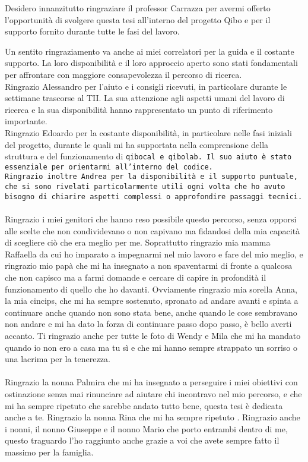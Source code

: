 Desidero innanzitutto ringraziare il professor Carrazza per avermi offerto l'opportunità di svolgere questa tesi all'interno del progetto Qibo e per il supporto fornito durante tutte le fasi del lavoro.

Un sentito ringraziamento va anche ai miei correlatori per la guida e il costante supporto. La loro disponibilità e il loro approccio aperto sono stati fondamentali per affrontare con maggiore consapevolezza il percorso di ricerca.\\
Ringrazio Alessandro per l'aiuto e i consigli ricevuti, in particolare durante le settimane trascorse al TII. La sua attenzione agli aspetti umani del lavoro di ricerca e la sua disponibilità hanno rappresentato un punto di riferimento importante.\\
Ringrazio Edoardo per la costante disponibilità, in particolare nelle fasi iniziali del progetto, durante le quali mi ha supportata nella comprensione della struttura e del funzionamento di \tt{qibocal} e \tt{qibolab}. Il suo aiuto è stato essenziale per orientarmi all'interno del codice.\\
Ringrazio inoltre Andrea per la disponibilità e il supporto puntuale, che si sono rivelati particolarmente utili ogni volta che ho avuto bisogno di chiarire aspetti complessi o approfondire passaggi tecnici.
\paragraph{}
Ringrazio i miei genitori che hanno reso possibile questo percorso, senza opporsi alle scelte che non condividevano o non capivano ma fidandosi della mia capacità di scegliere ciò che era meglio per me.
Soprattutto ringrazio mia mamma Raffaella da cui ho imparato a impegnarmi nel mio lavoro e fare del mio meglio, e ringrazio mio papà che mi ha insegnato a non spaventarmi di fronte a qualcosa che non capisco ma a farmi domande e cercare di capire in profondità il funzionamento di quello che ho davanti.
Ovviamente ringrazio mia sorella Anna, la mia cincips, che mi ha sempre sostenuto, spronato ad andare avanti e spinta a continuare anche quando non sono stata bene, anche quando le cose sembravano non andare e mi ha dato la forza di continuare passo dopo passo, è bello averti accanto.
Ti ringrazio anche per tutte le foto di Wendy e Mila che mi ha mandato quando io non ero a casa ma tu sì e che mi hanno sempre strappato un sorriso o una lacrima per la tenerezza.
\paragraph{}
Ringrazio la nonna Palmira che mi ha insegnato a perseguire i miei obiettivi con ostinazione senza mai rinunciare ad aiutare chi incontravo nel mio percorso, e che mi ha sempre ripetuto che sarebbe andato tutto bene, questa tesi è dedicata anche a te.
Ringrazio la nonna Rina che mi ha sempre ripetuto .
Ringrazio anche i nonni, il nonno Giuseppe e il nonno Mario che porto entrambi dentro di me, questo traguardo l'ho raggiunto anche grazie a voi che avete sempre fatto il massimo per la famiglia.
